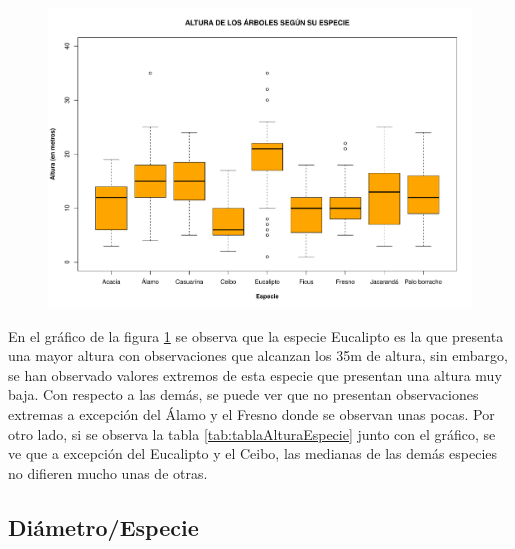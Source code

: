 \documentclass[11pt]{article}
\begin{document}
\begin{figure}[h!]
  \begin{center}
    \includegraphics[width=0.9\linewidth]{boxAlturaEspecie.pdf}
    \caption{}
    \label{fig:boxAlturaEspecie}
  \end{center}
\end{figure}

\begin{justify}
  En el gráfico de la figura \ref{fig:boxAlturaEspecie} se observa
  que la especie Eucalipto es la que presenta una mayor altura con observaciones
  que alcanzan los 35m de altura, sin embargo, se han observado valores extremos
  de esta especie que presentan una altura muy baja. Con respecto a las demás, se puede ver que no presentan observaciones extremas a excepción del
  Álamo y el Fresno donde se observan unas pocas.
  Por otro lado, si se observa la tabla \ref{tab:tablaAlturaEspecie} junto con el
  gráfico, se ve que a excepción del Eucalipto y el Ceibo, las medianas de las
  demás especies no difieren mucho unas de otras.
\end{justify}


\newpage
\subsection{Diámetro/Especie}
\end{document}
